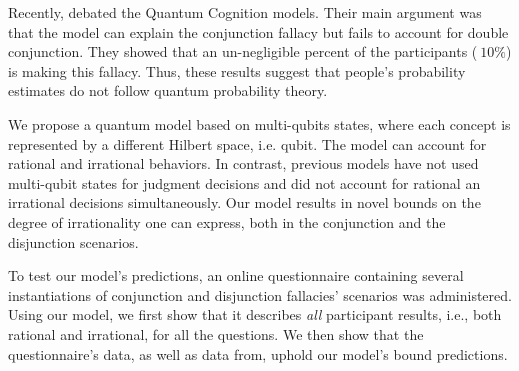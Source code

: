 \documentclass{article}
\begin{document}
Recently, debated the Quantum Cognition models. Their main argument was that the model can explain the conjunction fallacy but fails to account for double conjunction. They showed that an un-negligible percent of the participants ($~10\%$) is  making this fallacy. Thus, these results suggest that people's probability estimates do not follow quantum probability theory.

We propose a quantum model based on multi-qubits states, where each concept is represented by a different Hilbert space, i.e. qubit. 
The model can account for rational and irrational behaviors. 
In contrast, previous models have not used multi-qubit states for judgment decisions and did not account for rational an irrational decisions simultaneously.
Our model results in novel bounds on the degree of irrationality one can express, both in the conjunction and the disjunction scenarios.

To test our model's predictions, an online questionnaire containing several instantiations of conjunction and disjunction fallacies' scenarios was administered.
Using our model, we first show that it describes {\em all} participant results, i.e., both rational and irrational, for all the questions. 
We then show that the questionnaire's data, as well as data from, uphold our model's bound predictions.
\end{document}
